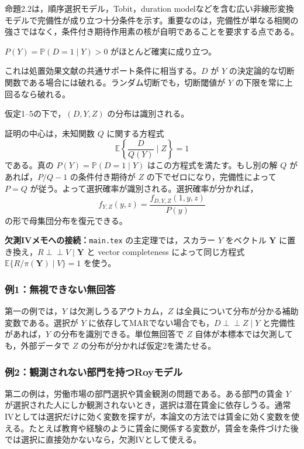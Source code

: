 \documentclass[10pt,a4paper]{article}
\newcommand{\indep}{\mathrel{\perp\!\!\!\perp}}
\newcommand{\E}{\mathbb{E}}
\newcommand{\Prb}{\mathbb{P}}
\newcommand{\connect}[1]{\par\smallskip\noindent\textbf{欠測IVメモへの接続：}#1\par\smallskip}
\begin{document}
命題2.2は，順序選択モデル，Tobit，duration modelなどを含む広い非線形変換モデルで完備性が成り立つ十分条件を示す。重要なのは，完備性が単なる相関の強さではなく，条件付き期待作用素の核が自明であることを要求する点である。

\begin{description}[leftmargin=3.2em]
\item[仮定5] $P(Y)=\Prb(D=1\mid Y)>0$ がほとんど確実に成り立つ。
\end{description}

これは処置効果文献の共通サポート条件に相当する。$D$ が $Y$ の決定論的な切断関数である場合には破れる。ランダム切断でも，切断閾値が $Y$ の下限を常に上回るなら破れる。

\begin{description}[leftmargin=3.2em]
\item[定理2.3] 仮定1--5の下で，$(D,Y,Z)$ の分布は識別される。
\end{description}

証明の中心は，未知関数 $Q$ に関する方程式
\[
\E\left\{\frac{D}{Q(Y)}\mid Z\right\}=1
\]
である。真の $P(Y)=\Prb(D=1\mid Y)$ はこの方程式を満たす。もし別の解 $Q$ があれば，$P/Q-1$ の条件付き期待が $Z$ の下でゼロになり，完備性によって $P=Q$ が従う。よって選択確率が識別される。選択確率が分かれば，
\[
f_{Y,Z}(y,z)=\frac{f_{D,Y,Z}(1,y,z)}{P(y)}
\]
の形で母集団分布を復元できる。

\connect{\texttt{main.tex} の主定理では，スカラー $Y$ をベクトル $\bm Y$ に置き換え，$R\indep V\mid \bm Y$ と vector completeness によって同じ方程式 $\E\{R/\pi(\bm Y)\mid V\}=1$ を使う。}

\subsubsection{例1：無視できない無回答}

第一の例では，$Y$ は欠測しうるアウトカム，$Z$ は全員について分布が分かる補助変数である。選択が $Y$ に依存してMARでない場合でも，$D\indep Z\mid Y$ と完備性があれば，$Y$ の分布を識別できる。単位無回答で $Z$ 自体が本標本では欠測しても，外部データで $Z$ の分布が分かれば仮定2を満たせる。

\subsubsection{例2：観測されない部門を持つRoyモデル}

第二の例は，労働市場の部門選択や賃金観測の問題である。ある部門の賃金 $Y$ が選択された人にしか観測されないとき，選択は潜在賃金に依存しうる。通常IVとしては選択だけに効く変数を探すが，本論文の方法では賃金に効く変数を使える。たとえば教育や経験のように賃金に関係する変数が，賃金を条件づけた後では選択に直接効かないなら，欠測IVとして使える。
\end{document}
